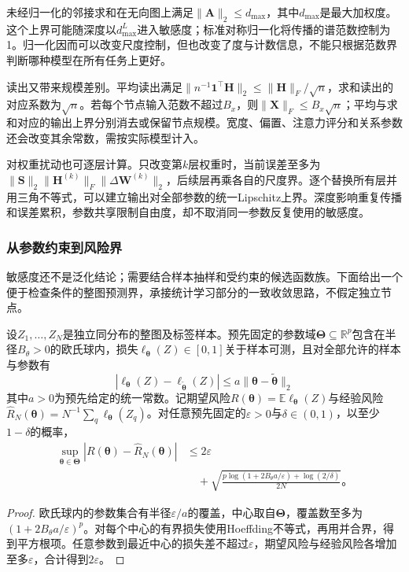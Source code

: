 未经归一化的邻接求和在无向图上满足$\lVert\bm{A}\rVert_2\leq d_{\max}$，其中$d_{\max}$是最大加权度。这个上界可能随深度以$d_{\max}^L$进入敏感度；标准对称归一化将传播的谱范数控制为1。归一化因而可以改变尺度控制，但也改变了度与计数信息，不能只根据范数界判断哪种模型在所有任务上更好。

读出又带来规模差别。平均读出满足$\lVert n^{-1}\bm{1}^{\top}\bm{H}\rVert_2\leq\lVert\bm{H}\rVert_F/\sqrt n$，求和读出的对应系数为$\sqrt n$。若每个节点输入范数不超过$B_x$，则$\lVert\bm{X}\rVert_F\leq B_x\sqrt n$；平均与求和对应的输出上界分别消去或保留节点规模。宽度、偏置、注意力评分和关系参数还会改变其余常数，需按实际模型计入。

对权重扰动也可逐层计算。只改变第$k$层权重时，当前误差至多为$\lVert\bm{S}\rVert_2\lVert\bm{H}^{(k)}\rVert_F\lVert\Delta\bm{W}^{(k)}\rVert_2$，后续层再乘各自的尺度界。逐个替换所有层并用三角不等式，可以建立输出对全部参数的统一Lipschitz上界。深度影响重复传播和误差累积，参数共享限制自由度，却不取消同一参数反复使用的敏感度。

\subsubsection{从参数约束到风险界}
\label{sec:gnn-risk-bound}

敏感度还不是泛化结论；需要结合样本抽样和受约束的候选函数族。下面给出一个便于检查条件的整图预测界，承接统计学习部分的一致收敛思路，不假定独立节点。

\begin{theorem}[有界参数图预测的覆盖界]
\label{thm:gnn-cover-generalization}
设$Z_1,\ldots,Z_N$是独立同分布的整图及标签样本。预先固定的参数域$\bm{\Theta}\subseteq\mathbb{R}^{p}$包含在半径$B_\theta>0$的欧氏球内，损失$\ell_{\bm{\theta}}(Z)\in[0,1]$关于样本可测，且对全部允许的样本与参数有
\[
  |\ell_{\bm{\theta}}(Z)-\ell_{\widetilde{\bm{\theta}}}(Z)|
    \leq a\lVert\bm{\theta}-\widetilde{\bm{\theta}}\rVert_2
\]
其中$a>0$为预先给定的统一常数。记期望风险$R(\bm{\theta})=\mathbb{E}\ell_{\bm{\theta}}(Z)$与经验风险$\widehat R_N(\bm{\theta})=N^{-1}\sum_q\ell_{\bm{\theta}}(Z_q)$。对任意预先固定的$\varepsilon>0$与$\delta\in(0,1)$，以至少$1-\delta$的概率，
\begin{equation}
  \begin{aligned}
    \sup_{\bm{\theta}\in\bm{\Theta}}
      |R(\bm{\theta})-\widehat R_N(\bm{\theta})|
      &\leq2\varepsilon\\
      &\quad+\sqrt{\frac{p\log(1+2B_\theta a/\varepsilon)
        +\log(2/\delta)}{2N}}\text{。}
  \end{aligned}
  \label{eq:gnn-cover-risk}
\end{equation}
\end{theorem}
\begin{proof}
欧氏球内的参数集合有半径$\varepsilon/a$的覆盖，中心取自$\bm{\Theta}$，覆盖数至多为$(1+2B_\theta a/\varepsilon)^p$。对每个中心的有界损失使用Hoeffding不等式，再用并合界，得到平方根项。任意参数到最近中心的损失差不超过$\varepsilon$，期望风险与经验风险各增加至多$\varepsilon$，合计得到$2\varepsilon$。
\end{proof}

